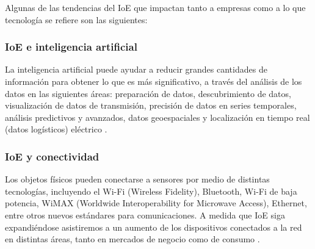 
Algunas de las tendencias del IoE que impactan tanto a empresas como a lo que tecnología se refiere son las siguientes: \\

\subsubsection{ IoE e inteligencia artificial }

La inteligencia artificial puede ayudar a reducir grandes cantidades de información para obtener lo que es más significativo, a través del análisis de los datos en las siguientes áreas: preparación de datos, descubrimiento de datos, visualización de datos de transmisión, precisión de datos en series temporales, análisis predictivos y avanzados, datos geoespaciales y localización en tiempo real (datos logísticos) eléctrico \cite{IoEOpenMindDos}. \\

\subsubsection{ IoE y conectividad}

Los objetos físicos pueden conectarse a sensores por medio de distintas tecnologías, incluyendo el Wi-Fi (Wireless Fidelity), Bluetooth, Wi-Fi de baja potencia, WiMAX (Worldwide Interoperability for Microwave Access), Ethernet, entre otros nuevos estándares para comunicaciones. A medida que IoE siga expandiéndose asistiremos a un aumento de los dispositivos conectados a la red en distintas áreas, tanto en mercados de negocio como de consumo  \cite{IoEFumec}. \\